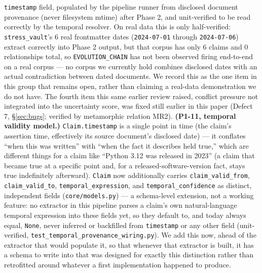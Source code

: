\texttt{timestamp} field, populated by the pipeline runner from disclosed
document provenance (never filesystem mtime) after Phase 2, and unit-verified
to be read correctly by the temporal resolver. On real data this is only
half-verified: \texttt{stress\_vault}'s 6 real frontmatter dates
(\texttt{2024-07-01} through \texttt{2024-07-06}) extract correctly into
Phase 2 output, but that corpus has only 6 claims and 0 relationships
total, so \texttt{EVOLUTION\_CHAIN} has not been observed firing
end-to-end on a real corpus --- no corpus we currently hold combines
disclosed dates with an actual contradiction between dated documents. We
record this as the one item in this group that remains open, rather than
claiming a real-data demonstration we do not have. The fourth item this
same earlier review raised, conflict pressure not integrated into the
uncertainty score, was fixed still earlier in this paper (Defect 7,
\S\ref{sec:bugs}; verified by metamorphic relation MR2).
\textbf{(P1-11, temporal validity model.)} \texttt{Claim.timestamp} is a
single point in time (the claim's assertion time, effectively its source
document's disclosed date) --- it conflates ``when this was written''
with ``when the fact it describes held true,'' which are different
things for a claim like ``Python 3.12 was released in 2023'' (a claim
that became true at a specific point and, for a released-software-version
fact, stays true indefinitely afterward). \texttt{Claim} now additionally
carries \texttt{claim\_valid\_from}, \texttt{claim\_valid\_to},
\texttt{temporal\_expression}, and \texttt{temporal\_confidence} as
distinct, independent fields (\texttt{core/models.py}) --- a schema-level
extension, not a working feature: no extractor in this pipeline parses a
claim's own natural-language temporal expression into these fields yet,
so they default to, and today always equal, \texttt{None}, never
inferred or backfilled from \texttt{timestamp} or any other field (unit-verified,
\texttt{test\_temporal\_provenance\_wiring.py}). We add this now, ahead of
the extractor that would populate it, so that whenever that extractor is
built, it has a schema to write into that was designed for exactly this
distinction rather than retrofitted around whatever a first
implementation happened to produce.

